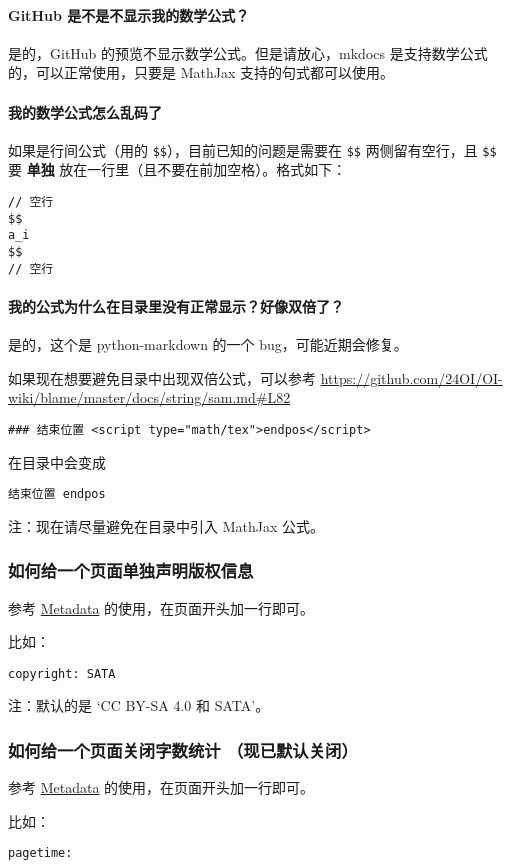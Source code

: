 \paragraph{GitHub 是不是不显示我的数学公式？}

是的，GitHub 的预览不显示数学公式。但是请放心，mkdocs 是支持数学公式的，可以正常使用，只要是 MathJax 支持的句式都可以使用。

\paragraph{我的数学公式怎么乱码了}

如果是行间公式（用的 \texttt{\$\$}），目前已知的问题是需要在 \texttt{\$\$} 两侧留有空行，且 \texttt{\$\$} 要 \textbf{单独} 放在一行里（且不要在前加空格）。格式如下：

\begin{verbatim}
// 空行
$$
a_i
$$
// 空行
\end{verbatim}

\paragraph{我的公式为什么在目录里没有正常显示？好像双倍了？}

是的，这个是 python-markdown 的一个 bug，可能近期会修复。

如果现在想要避免目录中出现双倍公式，可以参考 \url{https://github.com/24OI/OI-wiki/blame/master/docs/string/sam.md#L82}

\begin{verbatim}
### 结束位置 <script type="math/tex">endpos</script>
\end{verbatim}

在目录中会变成

\begin{verbatim}
结束位置 endpos
\end{verbatim}

注：现在请尽量避免在目录中引入 MathJax 公式。

\subsubsection{如何给一个页面单独声明版权信息}

参考 \href{https://squidfunk.github.io/mkdocs-material/extensions/metadata/#usage}{Metadata} 的使用，在页面开头加一行即可。

比如：

\begin{verbatim}
copyright: SATA
\end{verbatim}

注：默认的是 ‘CC BY-SA 4.0 和 SATA’。

\subsubsection{如何给一个页面关闭字数统计 （现已默认关闭）}

参考 \href{https://squidfunk.github.io/mkdocs-material/extensions/metadata/#usage}{Metadata} 的使用，在页面开头加一行即可。

比如：

\begin{verbatim}
pagetime:
\end{verbatim}

